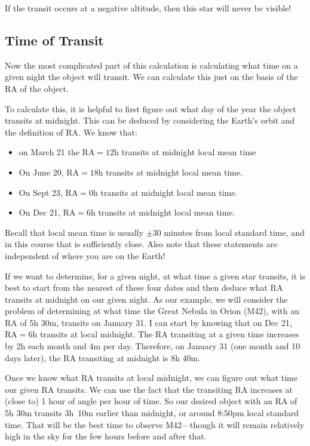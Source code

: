 \documentclass[12pt, preprint]{aastex}
\begin{document}
If the transit occurs at a negative altitude, then this star will
never be visible!

\subsection{Time of Transit}

Now the most complicated part of this calculation is calculating what
time on a given night the object will transit. We can calculate this
just on the basis of the RA of the object.

To calculate this, it is helpful to first figure out what day of the
year the object transits at midnight. This can be deduced by
considering the Earth's orbit and the definition of RA. We know that:
\begin{itemize}
\item on March 21 the RA$=12$h transits at midnight local mean
  time
  \item On June 20, RA$=18$h transits at midnight local mean time.
  \item On Sept 23, RA$=0$h transits at midnight local mean time.
  \item On Dec 21, RA$=6$h transits at midnight local mean time.
\end{itemize}
Recall that local mean time is usually $\pm 30$ minutes from local
standard time, and in this course that is sufficiently close. Also
note that these statements are independent of where you are on the
Earth!

If we want to determine, for a given night, at what time a given star
transits, it is best to start from the nearest of these four dates and
then deduce what RA transits at midnight on our given night.  As our
example, we will consider the problem of determining at what time the
Great Nebula in Orion (M42), with an RA of 5h 30m, transits on January
31.  I can start by knowing that on Dec 21, RA$=6$h transits at local
midnight. The RA transiting at a given time increases by 2h each month
and 4m per day. Therefore, on January 31 (one month and 10 days
later), the RA transiting at midnight is 8h 40m.

Once we know what RA transits at local midnight, we can figure out
what time our given RA transits. We can use the fact that the
transiting RA increases at (close to) 1 hour of angle per hour of
time. So our desired object with an RA of 5h 30m transits 3h~10m
earlier than midnight, or around 8:50pm local standard time. That will
be the best time to observe M42---though it will remain relatively
high in the sky for the few hours before and after that.
\end{document}

